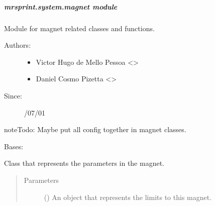 \documentclass[a4paper,10pt,english]{sphinxmanual}
\begin{document}
\subparagraph{mrsprint.system.magnet module}
\label{\detokenize{autodoc/mrsprint/mrsprint.system:module-mrsprint.system.magnet}}\label{\detokenize{autodoc/mrsprint/mrsprint.system:mrsprint-system-magnet-module}}
Module for magnet related classes and functions.
\begin{description}
\item[{Authors:}] \leavevmode\begin{itemize}
\item {} 
Victor Hugo de Mello Pessoa \textless{}\textgreater{}

\item {} 
Daniel Cosmo Pizetta \textless{}\textgreater{}

\end{itemize}

\item[{Since:}] /07/01

\end{description}

\begin{sphinxadmonition}{note}{\label{autodoc/mrsprint/mrsprint.system:index-2}Todo:}
Maybe put all config together in magnet classes.
\end{sphinxadmonition}

\begin{fulllineitems}
\label{\detokenize{autodoc/mrsprint/mrsprint.system:mrsprint.system.magnet.Magnet}}
Bases: 

Class that represents the parameters in the magnet.
\begin{quote}\begin{description}
\item[{Parameters}] \leavevmode
{} ({\hyperref[\detokenize{autodoc/mrsprint/mrsprint.system:mrsprint.system.magnet.MagnetConfig}]{}}) \textendash{} An object that represents the limits to this magnet.

\end{description}\end{quote}

\end{fulllineitems}
\end{document}
